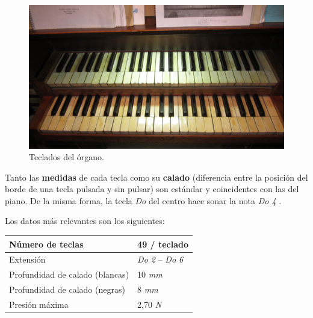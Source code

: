 \smallskip

\begin{figure}[H]
	\noindent \begin{centering}
		\includegraphics[width=\linewidth*3/4]{capitulo3/teclados}
		\par\end{centering}
	\smallskip
	\caption{\label{fig:teclados} Teclados del órgano.}
\end{figure} 

\smallskip

Tanto las \textbf{medidas} de cada tecla como su \textbf{calado} (diferencia entre la posición del borde de una tecla pulsada y sin pulsar) son estándar y coincidentes con las del piano. De la misma forma, la tecla \textit{Do} del centro hace sonar la nota \textit{Do 4} \footnotemark.


Los datos más relevantes son los siguientes:

\smallskip

\begin{center}
	\begin{tabular}{|l|l|}
		\hline Número de teclas & 49 / teclado \\
		\hline Extensión & \textit{Do 2} -- \textit{Do 6} \\
		\hline Profundidad de calado (blancas) & 10 \textit{mm} \\
		\hline Profundidad de calado (negras) & 8 \textit{mm} \\
		\hline Presión máxima & 2,70 \textit{N} \\
		\hline
	\end{tabular}
	\smallskip
\end{center}

